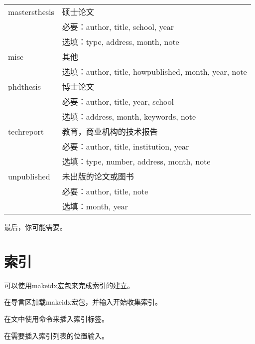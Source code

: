 \begin{table}[!htb]
\begin{tabular}{>{\ttfamily}ll}
\hline
mastersthesis & 硕士论文\\
& 必要：author, title, school, year \\
& 选填：type, address, month, note\\
\hline
misc & 其他 \\
& 选填：author, title, howpublished, month, year, note \\
\hline
phdthesis & 博士论文 \\
& 必要：author, title, year, school\\
& 选填：address, month, keywords, note\\
\hline
techreport & 教育，商业机构的技术报告\\
& 必要：author, title, institution, year\\
& 选填：type, number, address, month, note\\
\hline
unpublished & 未出版的论文或图书\\
& 必要：author, title, note\\
& 选填：month, year\\
\hline
\end{tabular}
\end{table}

最后，你可能需要。

\section{索引}
可以使用makeidx宏包来完成索引的建立。
\begin{feae}
\item 在导言区加载makeidx宏包，并输入\latexline{\\makeindex}开始收集索引。
\item 在文中使用\latexline{\\index}命令来插入索引标签。
\item 在需要插入索引列表的位置输入\latexline{\\printindex}。
\end{feae}

